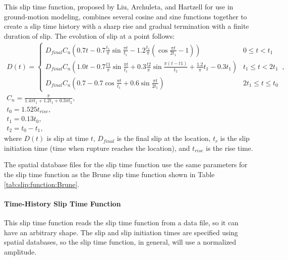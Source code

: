 This slip time function, proposed by Liu, Archuleta, and Hartzell
for use in ground-motion modeling\cite{Liu:etal:2006}, combines several
cosine and sine functions together to create a slip time history with
a sharp rise and gradual termination with a finite duration of slip.
The evolution of slip at a point follows: 
\begin{gather}
D(t)=\left\{ \begin{array}{cc}
D_{\mathit{final}}C_{n}\left(0.7t-0.7\frac{t_{1}}{\pi}\sin\frac{\pi t}{t_{1}}-1.2\frac{t_{1}}{\pi}\left(\cos\frac{\pi t}{2t_{1}}-1\right)\right) & 0\leq t<t_{1}\\
D_{\mathit{final}}C_{n}\left(1.0t-0.7\frac{t1}{\pi}\sin\frac{\pi t}{t_{1}}+0.3\frac{t2}{\pi}\sin\frac{\pi(t-t1)}{t_{2}}+\frac{1.2}{\pi}t_{1}-0.3t_{1}\right) & t_{1}\leq t<2t_{1}\\
D_{\mathit{final}}C_{n}\left(0.7-0.7\cos\frac{\pi t}{t_{1}}+0.6\sin\frac{\pi t}{2t_{1}}\right) & 2t_{1}\leq t\leq t_{0}
\end{array}\right.\,,\\
C_{n}=\frac{\pi}{1.4\pi t_{1}+1.2t_{1}+0.3\pi t_{2}},\\
t_{0}=1.525t_{\mathit{rise}},\\
t_{1}=0.13t_{0},\\
t_{2}=t_{0}-t_{1},
\end{gather}
where $D(t)$ is slip at time $t$, $D_{final}$ is the final slip
at the location, $t_{r}$ is the slip initiation time (time when rupture
reaches the location), and $t_{\mathit{rise}}$ is the rise time.
\begin{inventory}
\end{inventory}
The spatial database files for the slip time function use the same
parameters for the slip time function as the Brune slip time function
shown in Table \vref{tab:slip:function:Brune}.


\paragraph{Time-History Slip Time Function}

This slip time function reads the slip time function from a data file,
so it can have an arbitrary shape. The slip and slip initiation times
are specified using spatial databases, so the slip time function,
in general, will use a normalized amplitude.
\begin{inventory}
\end{inventory}

